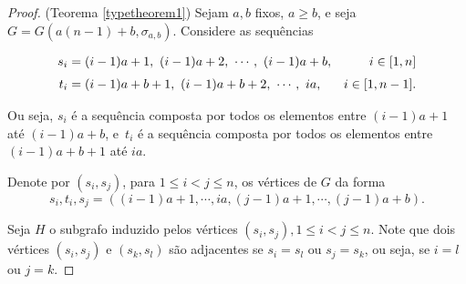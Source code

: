 \begin{proof}(Teorema \ref{typetheorem1})
Sejam $a,b$ fixos, $a \geq b$, e seja $G = G(a(n-1)+b, \sigma_{a,b})$. Considere as sequências

\begin{equation*}
\setlength{\jot}{6pt}
\begin{aligned}
s_i &= (i-1)a+1,\ (i-1)a+2,\ \cdots,\ (i-1)a+b, & i\in [1,n] \\
t_i &= (i-1)a+b+1,\ (i-1)a+b+2,\ \cdots,\ ia, & i\in [1,n-1].
\end{aligned}
\end{equation*}

Ou seja, $s_i$ é a sequência composta por todos os elementos entre $(i-1)a + 1$ até $(i-1)a+b$, e~$t_i$ é a sequência composta por todos os elementos entre $(i-1)a + b+1$ até $ia$.

Denote por $(s_i,s_j)$, para $1\leq i < j \leq n$, os vértices de $G$ da forma \[s_i,t_i,s_j = ((i-1)a+1,\cdots, ia, (j-1)a+1,\cdots, (j-1)a+b).\]

    
    

Seja $H$ o subgrafo induzido pelos vértices $(s_i,s_j), 1\leq i<j\leq n$. Note que dois vértices $(s_i,s_j)$ e $(s_k,s_l)$ são adjacentes se $s_i = s_l$ ou $s_j = s_k$, ou seja, se $i=l$ ou $j=k$.



\end{proof}
